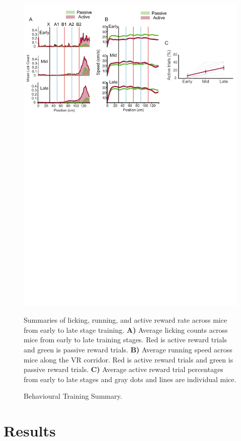 \begin{figure}
    \centering
    \includegraphics[width=1\linewidth]{figures//Chapter 3 Behaviour//Thesis Figures//figure_PDFs/fig3_behavioural_learning_summary.pdf}
    \caption{Behavioural Training Summary. }
\medskip
\small
Summaries of licking, running, and active reward rate across mice from early to late stage training. \textbf{A)} Average licking counts across mice from early to late training stages. Red is active reward trials and green is passive reward trials. \textbf{B)} Average running speed across mice along the VR corridor. Red is active reward trials and green is passive reward trials. \textbf{C)} Average active reward trial percentages from early to late stages and gray dots and lines are individual mice.
    \label{fig:training behaviour summary}
\end{figure}

\section{Results}
